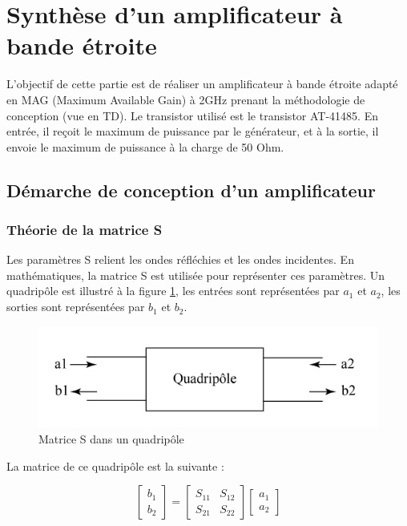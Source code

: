 \documentclass[french]{article}
\begin{document}
\section{Synthèse d'un amplificateur à bande étroite}
L’objectif de cette partie est de réaliser un amplificateur à bande étroite adapté en MAG (Maximum Available Gain) à 2GHz prenant la méthodologie de conception (vue en TD). Le transistor utilisé est le transistor AT-41485. En entrée, il reçoit le maximum de puissance par le générateur, et à la sortie, il envoie le maximum de puissance à la charge de 50 Ohm.

\subsection{Démarche de conception d’un amplificateur}
\subsubsection{Théorie de la matrice S}
Les paramètres S relient les ondes réfléchies et les ondes incidentes. En mathématiques, la matrice S est utilisée pour représenter ces paramètres. Un quadripôle est illustré à la figure \ref{fig:matrice_s}, les entrées sont représentées par $a_{1}$ et $a_{2}$, les sorties sont représentées par $b_{1}$ et $b_{2}$. 

\begin{figure}[H]
	\centering
	\includegraphics[width=0.9\linewidth]{../5SynthAmp/Matrice_S}
	\caption{Matrice S dans un quadripôle}
	\label{fig:matrice_s}
\end{figure}

La matrice de ce quadripôle est la suivante :

\begin{equation}
	\begin{bmatrix}
		b_{1}\\
		b_{2}
	\end{bmatrix}
	=
	\begin{bmatrix}
		S_{11} & S_{12}\\
		S_{21} & S_{22}
	\end{bmatrix}
	\begin{bmatrix}
		a_{1}\\
		a_{2}
	\end{bmatrix}
\end{equation}
\end{document}
